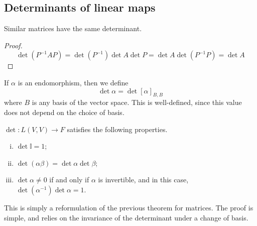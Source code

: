 \subsection{Determinants of linear maps}
\begin{lemma}
	Similar matrices have the same determinant.
\end{lemma}
\begin{proof}
	\[
		\det (P^{-1} A P) = \det(P^{-1}) \det A \det P = \det A \det (P^{-1} P) = \det A
	\]
\end{proof}
\begin{definition}
	If \( \alpha \) is an endomorphism, then we define
	\[
		\det \alpha = \det [\alpha]_{B, B}
	\]
	where \( B \) is any basis of the vector space.
	This is well-defined, since this value does not depend on the choice of basis.
\end{definition}
\begin{theorem}
	\( \det \colon L(V,V) \to F \) satisfies the following properties.
	\begin{enumerate}[(i)]
		\item \( \det \mathbb I = 1 \);
		\item \( \det (\alpha\beta) = \det\alpha \det\beta \);
		\item \( \det \alpha \neq 0 \) if and only if \( \alpha \) is invertible, and in this case, \( \det(\alpha^{-1}) \det \alpha = 1 \).
	\end{enumerate}
	This is simply a reformulation of the previous theorem for matrices.
	The proof is simple, and relies on the invariance of the determinant under a change of basis.
\end{theorem}

